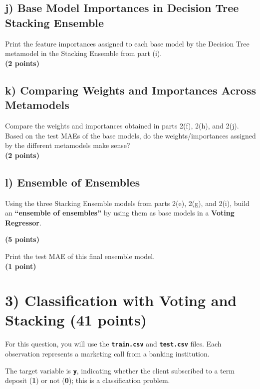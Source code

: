 \documentclass[
  letterpaper,
  DIV=11,
  numbers=noendperiod]{scrreprt}
\begin{document}
\subsection{j) Base Model Importances in Decision Tree Stacking
Ensemble}\label{j-base-model-importances-in-decision-tree-stacking-ensemble}

Print the feature importances assigned to each base model by the
Decision Tree metamodel in the Stacking Ensemble from part (i).\\
\textbf{(2 points)}

\subsection{k) Comparing Weights and Importances Across
Metamodels}\label{k-comparing-weights-and-importances-across-metamodels}

Compare the weights and importances obtained in parts 2(f), 2(h), and
2(j).\\
Based on the test MAEs of the base models, do the weights/importances
assigned by the different metamodels make sense?\\
\textbf{(2 points)}

\subsection{l) Ensemble of Ensembles}\label{l-ensemble-of-ensembles}

Using the three Stacking Ensemble models from parts 2(e), 2(g), and
2(i), build an \textbf{``ensemble of ensembles''} by using them as base
models in a \textbf{Voting Regressor}.

\textbf{(5 points)}

Print the test MAE of this final ensemble model.\\
\textbf{(1 point)}

\section{3) Classification with Voting and Stacking (41
points)}\label{classification-with-voting-and-stacking-41-points}

For this question, you will use the \textbf{\texttt{train.csv}} and
\textbf{\texttt{test.csv}} files. Each observation represents a
marketing call from a banking institution.

The target variable is \textbf{\texttt{y}}, indicating whether the
client subscribed to a term deposit (\textbf{1}) or not (\textbf{0});
this is a classification problem.
\end{document}
